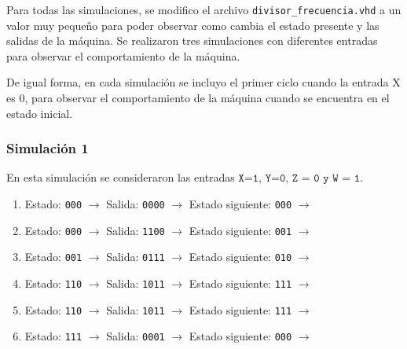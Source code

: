 \documentclass[12pt, letterpaper]{article}
\begin{document}
Para todas las simulaciones, se modifico el archivo \texttt{divisor\_frecuencia.vhd} a un valor muy pequeño para poder observar como cambia el estado presente y las salidas de la máquina. Se realizaron tres simulaciones con diferentes entradas para observar el comportamiento de la máquina.

De igual forma, en cada simulación se incluyo el primer ciclo cuando la entrada X es 0, para observar el comportamiento de la máquina cuando se encuentra en el estado inicial.

\subsubsection*{Simulación 1}

En esta simulación se consideraron las entradas \(\texttt{X=1, Y=0, Z = 0 y W = 1}\).
\begin{enumerate}
    \item[\textcolor{red}{sec-1:}] Estado: \texttt{000} \(\rightarrow\) Salida: \texttt{0000} \(\rightarrow\) Estado siguiente: \texttt{000} \(\rightarrow\)
    \item[\textcolor{red}{sec-2:}] Estado: \texttt{000} \(\rightarrow\) Salida: \texttt{1100} \(\rightarrow\) Estado siguiente: \texttt{001} \(\rightarrow\)
    \item[\textcolor{red}{sec-3:}] Estado: \texttt{001} \(\rightarrow\) Salida: \texttt{0111} \(\rightarrow\) Estado siguiente: \texttt{010} \(\rightarrow\)
    \item[\textcolor{red}{sec-4:}] Estado: \texttt{110} \(\rightarrow\) Salida: \texttt{1011} \(\rightarrow\) Estado siguiente: \texttt{111} \(\rightarrow\)
    \item[\textcolor{red}{sec-5:}] Estado: \texttt{110} \(\rightarrow\) Salida: \texttt{1011} \(\rightarrow\) Estado siguiente: \texttt{111} \(\rightarrow\)
    \item[\textcolor{red}{sec-6:}] Estado: \texttt{111} \(\rightarrow\) Salida: \texttt{0001} \(\rightarrow\) Estado siguiente: \texttt{000} \(\rightarrow\)
\end{enumerate}
\end{document}
